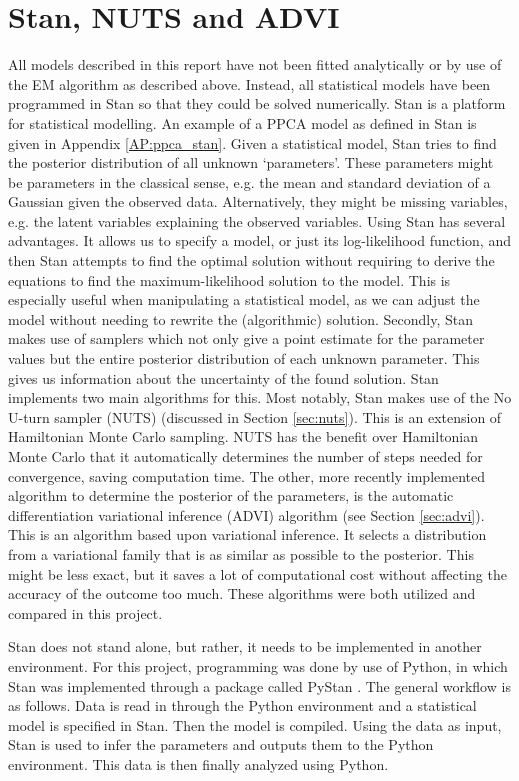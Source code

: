 \section{Stan, NUTS and ADVI}\label{sec:stan}

All models described in this report have not been fitted analytically or by use of the EM algorithm as described above. Instead, all statistical models have been programmed in Stan so that they could be solved numerically. Stan is a platform for statistical modelling. An example of a PPCA model as defined in Stan is given in Appendix \ref{AP:ppca_stan}. Given a statistical model, Stan tries to find the posterior distribution of all unknown `parameters'. These parameters might be parameters in the classical sense, e.g. the mean and standard deviation of a Gaussian given the observed data. Alternatively, they might be missing variables, e.g. the latent variables explaining the observed variables. Using Stan has several advantages. It allows us to specify a model, or just its log-likelihood function, and then Stan attempts to find the optimal solution without requiring to derive the equations to find the maximum-likelihood solution to the model. This is especially useful when manipulating a statistical model, as we can adjust the model without needing to rewrite the (algorithmic) solution. Secondly, Stan makes use of samplers which not only give a point estimate for the parameter values but the entire posterior distribution of each unknown parameter. This gives us information about the uncertainty of the found solution. Stan implements two main algorithms for this. Most notably, Stan makes use of the No U-turn sampler (NUTS) (discussed in Section \ref{sec:nuts}). This is an extension of Hamiltonian Monte Carlo sampling. NUTS has the benefit over Hamiltonian Monte Carlo that it automatically determines the number of steps needed for convergence, saving computation time. The other, more recently implemented algorithm to determine the posterior of the parameters, is the automatic differentiation variational inference (ADVI) algorithm (see Section \ref{sec:advi}). This is an algorithm based upon variational inference. It selects a distribution from a variational family that is as similar as possible to the posterior. This might be less exact, but it saves a lot of computational cost without affecting the accuracy of the outcome too much. These algorithms were both utilized and compared in this project.

Stan does not stand alone, but rather, it needs to be implemented in another environment. For this project, programming was done by use of Python, in which Stan was implemented through a package called PyStan \cite{stan2018pystan}. The general workflow is as follows. Data is read in through the Python environment and a statistical model is specified in Stan. Then the model is compiled. Using the data as input, Stan is used to infer the parameters and outputs them to the Python environment. This data is then finally analyzed using Python.

